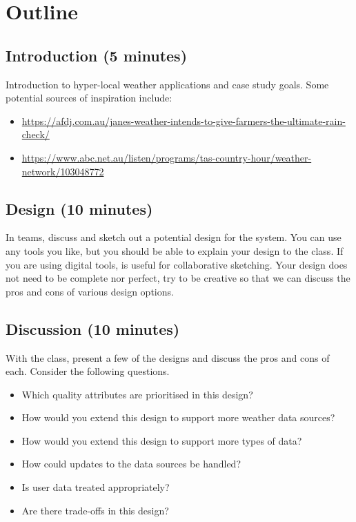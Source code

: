 \documentclass{csse4400}
\begin{document}
\section{Outline}

\subsection*{Introduction (5 minutes)}
Introduction to hyper-local weather applications and case study goals.
Some potential sources of inspiration include:
\begin{itemize}[topsep=5pt,partopsep=2pt,itemsep=2pt,parsep=2pt]
    \item \url{https://afdj.com.au/janes-weather-intends-to-give-farmers-the-ultimate-rain-check/}
    \item \url{https://www.abc.net.au/listen/programs/tas-country-hour/weather-network/103048772}
\end{itemize}


\subsection*{Design (10 minutes)}
In teams, discuss and sketch out a potential design for the system.
You can use any tools you like, but you should be able to explain your design to the class.
If you are using digital tools,  is useful for collaborative sketching.
Your design does not need to be complete nor perfect,
try to be creative so that we can discuss the pros and cons of various design options.

\subsection*{Discussion (10 minutes)}
With the class, present a few of the designs and discuss the pros and cons of each.
Consider the following questions.
\begin{itemize}
\item Which quality attributes are prioritised in this design?
\item How would you extend this design to support more weather data sources?
\item How would you extend this design to support more types of data?
\item How could updates to the data sources be handled?
\item Is user data treated appropriately?
\item Are there trade-offs in this design?
\end{itemize}
\end{document}
